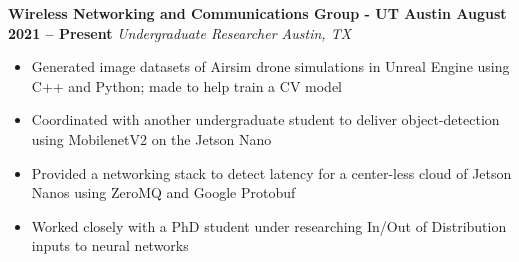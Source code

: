 \documentclass[../main.tex]{subfiles}
\begin{document}
\noindent\textbf{{\fontsize{12}{14}\selectfont Wireless Networking and Communications Group - UT Austin \hfill August 2021 – Present}}\newline
\emph{Undergraduate Researcher \hfill Austin, TX}\newline
\vspace{-\topsep}
\begin{itemize}
  \setlength{\itemindent}{-6mm}
  \vspace{-0.2cm}\item Generated image datasets of Airsim drone simulations in Unreal Engine using C++ and Python; made to help train a CV model
  \vspace{-0.2cm}\item Coordinated with another undergraduate student to deliver object-detection using MobilenetV2 on the Jetson Nano
  \vspace{-0.2cm}\item Provided a networking stack to detect latency for a center-less cloud of Jetson Nanos using ZeroMQ and Google Protobuf
  \vspace{-0.2cm}\item Worked closely with a PhD student under researching In/Out of Distribution inputs to neural networks
\end{itemize}
\end{document}
